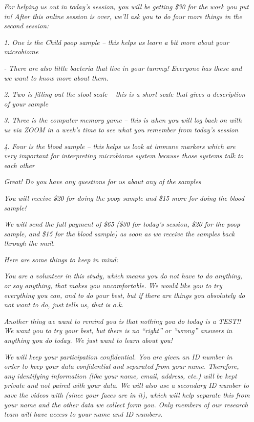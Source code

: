 \documentclass[]{book}
\begin{document}
\emph{For helping us out in today's session, you will be getting \$30 for the work you put in! After this online session is over, we'll ask you to do four more things in the second session:}

\emph{1. One is the Child poop sample -- this helps us learn a bit more about your microbiome}

\emph{- There are also little bacteria that live in your tummy! Everyone has these and we want to know more about them.}

\emph{2. Two is filling out the stool scale -- this is a short scale that gives a description of your sample}

\emph{3. Three is the computer memory game -- this is when you will log back on with us via ZOOM in a week's time to see what you remember from today's session}

\emph{4. Four is the blood sample -- this helps us look at immune markers which are very important for interpreting microbiome system because those systems talk to each other}

\emph{Great! Do you have any questions for us about any of the samples}

\emph{You will receive \$20 for doing the poop sample and \$15 more for doing the blood sample!}

\emph{We will send the full payment of \$65 (\$30 for today's session, \$20 for the poop sample, and \$15 for the blood sample) as soon as we receive the samples back through the mail.}

\emph{Here are some things to keep in mind:}

\emph{You are a volunteer in this study, which means you do not have to do anything, or say anything, that makes you uncomfortable. We would like you to try everything you can, and to do your best, but if there are things you absolutely do not want to do, just tells us, that is o.k.}

\emph{Another thing we want to remind you is that nothing you do today is a TEST!! We want you to try your best, but there is no ``right'' or ``wrong'' answers in anything you do today. We just want to learn about you!}

\emph{We will keep your participation confidential. You are given an ID number in order to keep your data confidential and separated from your name. Therefore, any identifying information (like your name, email, address, etc.) will be kept private and not paired with your data. We will also use a secondary ID number to save the videos with (since your faces are in it), which will help separate this from your name and the other data we collect form you. Only members of our research team will have access to your name and ID numbers.}
\end{document}
